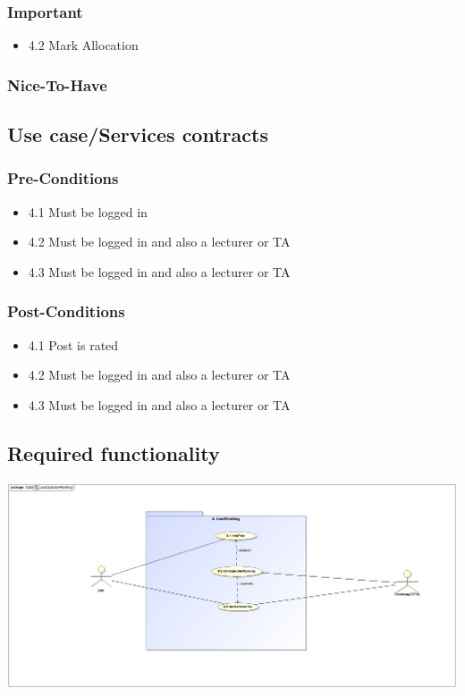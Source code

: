 \documentclass[hidelinks, 12pt, oneside]{article}
\begin{document}
\subsubsection{Important}
\begin{itemize}
  \item 4.2 Mark Allocation
\end{itemize}
\subsubsection{Nice-To-Have}


\subsection{Use case/Services contracts}
\subsubsection{Pre-Conditions}								%
\begin{itemize}
  \item 4.1 Must be logged in
  \item 4.2 Must be logged in and also a lecturer or TA
  \item 4.3 Must be logged in and also a lecturer or TA
\end{itemize}

\subsubsection{Post-Conditions}%
\begin{itemize}
  \item 4.1 Post is rated
  \item 4.2 Must be logged in and also a lecturer or TA
  \item 4.3 Must be logged in and also a lecturer or TA
\end{itemize}

\subsection{Required functionality} 
\includegraphics[scale=.9]{Kgomotso/graphics/useCaseUserRanking.eps}\\
\end{document}
